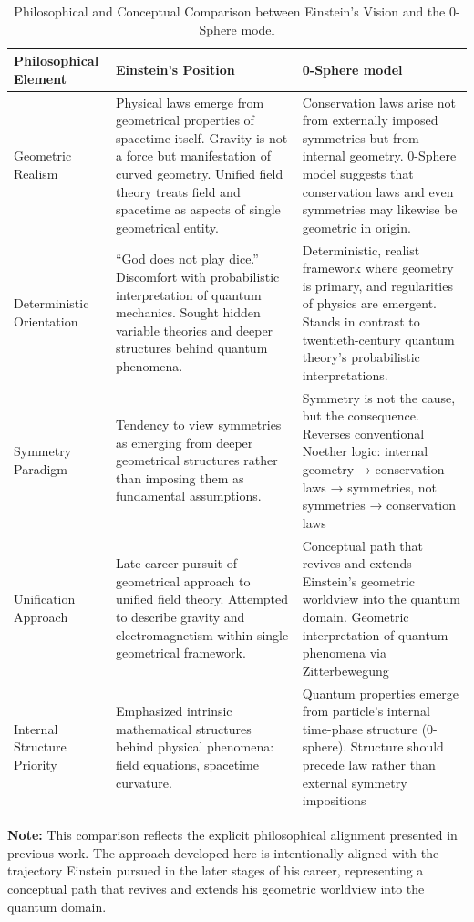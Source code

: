\documentclass[%
 reprint,
 amsmath,amssymb,
 aps,
]{revtex4-1}
\numberwithin{equation}{section}%
\begin{document}
\begin{table}[!htbp]
\caption{Philosophical and Conceptual Comparison between Einstein's Vision and the 0-Sphere model}
\label{tab:einstein_hanamura_comparison}
\renewcommand{\arraystretch}{1.4}
\begin{tabular}{p{4.0cm}p{6.5cm}p{6.5cm}}
\toprule
\textbf{Philosophical Element} & \textbf{Einstein's Position} & \textbf{0-Sphere model} \\
\midrule
Geometric Realism & Physical laws emerge from geometrical properties of spacetime itself. Gravity is not a force but manifestation of curved geometry. Unified field theory treats field and spacetime as aspects of single geometrical entity. & Conservation laws arise not from externally imposed symmetries but from internal geometry. 0-Sphere model suggests that conservation laws and even symmetries may likewise be geometric in origin. \\
\addlinespace[0.3cm]
Deterministic Orientation & ``God does not play dice.'' Discomfort with probabilistic interpretation of quantum mechanics. Sought hidden variable theories and deeper structures behind quantum phenomena. & Deterministic, realist framework where geometry is primary, and regularities of physics are emergent. Stands in contrast to twentieth-century quantum theory's probabilistic interpretations. \\
\addlinespace[0.3cm]
Symmetry Paradigm & Tendency to view symmetries as emerging from deeper geometrical structures rather than imposing them as fundamental assumptions. & Symmetry is not the cause, but the consequence. Reverses conventional Noether logic: internal geometry → conservation laws → symmetries, not symmetries → conservation laws \\
\addlinespace[0.3cm]
Unification Approach & Late career pursuit of geometrical approach to unified field theory. Attempted to describe gravity and electromagnetism within single geometrical framework. & Conceptual path that revives and extends Einstein's geometric worldview into the quantum domain. Geometric interpretation of quantum phenomena via Zitterbewegung \\
\addlinespace[0.3cm]
Internal Structure Priority & Emphasized intrinsic mathematical structures behind physical phenomena: field equations, spacetime curvature. & Quantum properties emerge from particle's internal time-phase structure (0-sphere). Structure should precede law rather than external symmetry impositions \\
\bottomrule
\end{tabular}
\vspace{0.2cm}
\begin{flushleft}
\footnotesize
\textbf{Note:} This comparison reflects the explicit philosophical alignment presented in previous work. The approach developed here is intentionally aligned with the trajectory Einstein pursued in the later stages of his career, representing a conceptual path that revives and extends his geometric worldview into the quantum domain.
\end{flushleft}
\end{table}
\end{document}
